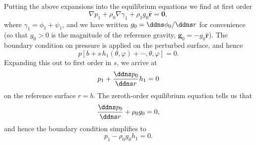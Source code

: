 Putting the above expansions into the equilibrium equations we find at first order
\begin{equation}
\nabla p_{1}+\rho_{0}\nabla\gamma_{1}+\rho_{1}g_{0}\hat{\mathbf{r}}=\mathbf{0},
\label{eq:22}
\end{equation}
where $\gamma_{1}=\phi_{1}+\psi_{1}$, and we have written $g_{0}=\ddns\phi_{0}/\ddns r$ for convenience (so that $g_{0}>0$ is the magnitude of the reference gravity, $\mathbf{g}_{0}=-g_{0}\hat{\mathbf{r}}$). 
The boundary condition on pressure is applied on the perturbed surface, and hence
\begin{equation}
p[b+s\,h_{1}(\theta,\varphi)+\cdots,\theta,\varphi]=0.
\label{eq:23}
\end{equation}
Expanding this out to first order in $s$, we arrive at
\begin{equation}
p_{1}+\frac{\ddns p_{0}}{\ddns r}h_{1}=0
\label{eq:24}
\end{equation}
on the reference surface $r=b$. The zeroth-order equilibrium equation tells us that
\begin{equation}
\frac{\ddns p_{0}}{\ddns r}+\rho_{0}g_{0}=0,
\label{eq:25}
\end{equation}
and hence the boundary condition simplifies to
\begin{equation}
p_{1}-\rho_{0}g_{0}h_{1}=0.
\label{eq:26}
\end{equation}


